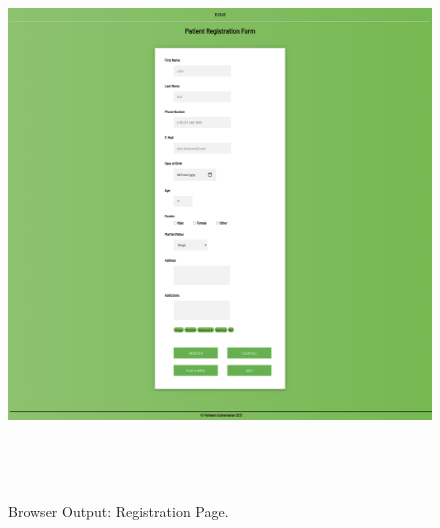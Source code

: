 \documentclass[12pt, a4]{article}
\begin{document}
\newpage
\subsection*{}
\begin{figure}[h]
\centering
\caption{Browser Output: Registration Page.}
\includegraphics[height=15cm, width=18cm]{Output/RegForm.png}
\end{figure}

\newpage
\end{document}
